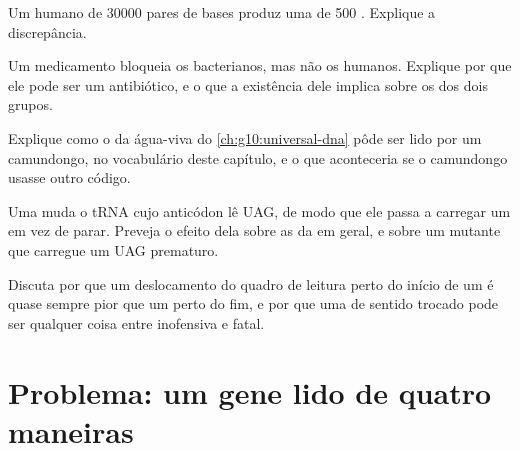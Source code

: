 \begin{exercise}[$\star\star$]\label{exo:g11:gene-expression:11}
Um  humano de \num{30000} pares de bases produz uma  de 500
. Explique a discrepância.
\end{exercise}

\begin{exercise}[$\star\star\star$]\label{exo:g11:gene-expression:12}
Um medicamento bloqueia os  bacterianos, mas não os humanos.
Explique por que ele pode ser um antibiótico, e o que a existência dele
implica sobre os  dos dois grupos.
\end{exercise}

\begin{exercise}[$\star\star\star$]\label{exo:g11:gene-expression:13}
Explique como o  da água-viva do \cref{ch:g10:universal-dna} pôde
ser lido por um camundongo, no vocabulário deste capítulo, e o que
aconteceria se o camundongo usasse outro código.
\end{exercise}

\begin{exercise}[$\star\star\star$]\label{exo:g11:gene-expression:14}
Uma  muda o tRNA cujo anticódon lê UAG, de modo que ele passa a
carregar um  em vez de parar. Preveja o efeito dela sobre as
 da  em geral, e sobre um  mutante que carregue um
UAG prematuro.
\end{exercise}

\begin{exercise}[$\star\star\star$]\label{exo:g11:gene-expression:15}
Discuta por que um deslocamento do quadro de leitura perto do início de
um  é quase sempre pior que um perto do fim, e por que uma 
de sentido trocado pode ser qualquer coisa entre inofensiva e fatal.
\end{exercise}

\section{Problema: um gene lido de quatro maneiras}

